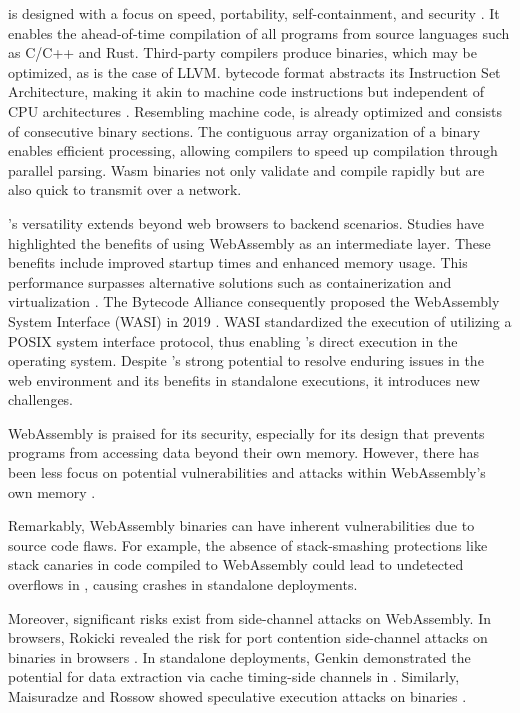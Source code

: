 \Wasm is designed with a focus on speed, portability, self-containment, and security \cite{Haas_2017}. 
It enables the ahead-of-time compilation of all programs from source languages such as C/C++ and Rust. 
Third-party compilers produce \Wasm binaries, which may be optimized, as is the case of LLVM. 
\Wasm bytecode format abstracts its Instruction Set Architecture, making it akin to machine code instructions but independent of CPU architectures \cite{wasm_spec}. 
Resembling machine code, \Wasm is already optimized and consists of consecutive binary sections. 
The contiguous array organization of a \Wasm binary enables efficient processing, allowing compilers to speed up compilation through parallel parsing. 
Wasm binaries not only validate and compile rapidly but are also quick to transmit over a network.

\Wasm's versatility extends beyond web browsers to backend scenarios. 
Studies have highlighted the benefits of using WebAssembly as an intermediate layer. 
These benefits include improved startup times and enhanced memory usage. 
This performance surpasses alternative solutions such as containerization and virtualization \cite{pMendkiServerless, 1244493Jacobsson}. 
The Bytecode Alliance consequently proposed the WebAssembly System Interface (WASI) in 2019 \cite{bytecodealliance, WASI}.
WASI standardized the execution of \Wasm utilizing a POSIX system interface protocol, thus enabling \Wasm's direct execution in the operating system.
Despite \Wasm's strong potential to resolve enduring issues in the web environment and its benefits in standalone executions, it introduces new challenges.


WebAssembly is praised for its security, especially for its design that prevents programs from accessing data beyond their own memory. 
However, there has been less focus on potential vulnerabilities and attacks within WebAssembly's own memory \cite{usenixWasm2020}.

Remarkably, WebAssembly binaries can have inherent vulnerabilities due to source code flaws. 
For example, the absence of stack-smashing protections like stack canaries in code compiled to WebAssembly could lead to undetected overflows in \Wasm, causing crashes \cite{DeRoover2022} in standalone deployments.


Moreover, significant risks exist from side-channel attacks on WebAssembly.
In browsers, Rokicki \etal revealed the risk for port contention side-channel attacks on \Wasm binaries in browsers \cite{10.1145/3488932.3517411}. 
In standalone deployments, Genkin \etal demonstrated the potential for data extraction via cache timing-side channels in \Wasm \cite{Genkin2018DrivebyKC}. 
Similarly, Maisuradze and Rossow showed speculative execution attacks on \Wasm binaries \cite{ret2spec}. 


